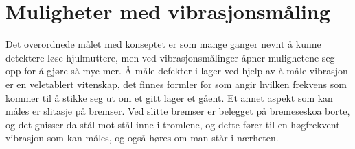 \section {Muligheter med vibrasjonsmåling}
Det overordnede målet med konseptet er som mange ganger nevnt 
å kunne detektere løse hjulmuttere, men ved vibrasjonsmålinger åpner mulighetene seg 
opp for å gjøre så mye mer. Å måle defekter i lager ved hjelp av å måle vibrasjon er en 
veletablert vitenskap, det finnes formler for som angir hvilken frekvens som kommer til 
å stikke seg ut om et gitt lager et gåent. Et annet aspekt som kan måles er slitasje på bremser. 
Ved slitte bremser er belegget på bremeseskoa borte, og det gnisser da stål mot stål inne i tromlene, 
og dette fører til en høgfrekvent vibrasjon som kan måles, og også høres om man står i nærheten. 